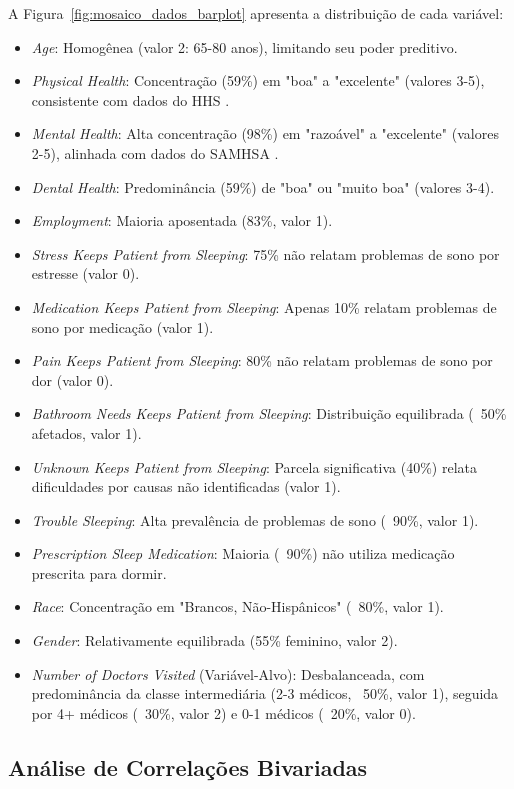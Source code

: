 \documentclass[12pt]{article}
\begin{document}
A Figura~\ref{fig:mosaico_dados_barplot} apresenta a distribuição de cada variável:
\begin{itemize}
    \item \textit{Age}: Homogênea (valor 2: 65-80 anos), limitando seu poder preditivo.
    \item \textit{Physical Health}: Concentração (59\%) em "boa" a "excelente" (valores 3-5), consistente com dados do HHS \cite{ACL_AoA2018}.
    \item \textit{Mental Health}: Alta concentração (98\%) em "razoável" a "excelente" (valores 2-5), alinhada com dados do SAMHSA \cite{SAMHSA2017}.
    \item \textit{Dental Health}: Predominância (59\%) de "boa" ou "muito boa" (valores 3-4).
    \item \textit{Employment}: Maioria aposentada (83\%, valor 1).
    \item \textit{Stress Keeps Patient from Sleeping}: 75\% não relatam problemas de sono por estresse (valor 0).
    \item \textit{Medication Keeps Patient from Sleeping}: Apenas 10\% relatam problemas de sono por medicação (valor 1).
    \item \textit{Pain Keeps Patient from Sleeping}: 80\% não relatam problemas de sono por dor (valor 0).
    \item \textit{Bathroom Needs Keeps Patient from Sleeping}: Distribuição equilibrada (~50\% afetados, valor 1).
    \item \textit{Unknown Keeps Patient from Sleeping}: Parcela significativa (40\%) relata dificuldades por causas não identificadas (valor 1).
    \item \textit{Trouble Sleeping}: Alta prevalência de problemas de sono (~90\%, valor 1).
    \item \textit{Prescription Sleep Medication}: Maioria (~90\%) não utiliza medicação prescrita para dormir.
    \item \textit{Race}: Concentração em "Brancos, Não-Hispânicos" (~80\%, valor 1).
    \item \textit{Gender}: Relativamente equilibrada (55\% feminino, valor 2).
    \item \textit{Number of Doctors Visited} (Variável-Alvo): Desbalanceada, com predominância da classe intermediária (2-3 médicos, ~50\%, valor 1), seguida por 4+ médicos (~30\%, valor 2) e 0-1 médicos (~20\%, valor 0).
\end{itemize}

\subsection{Análise de Correlações Bivariadas} 
\end{document}
